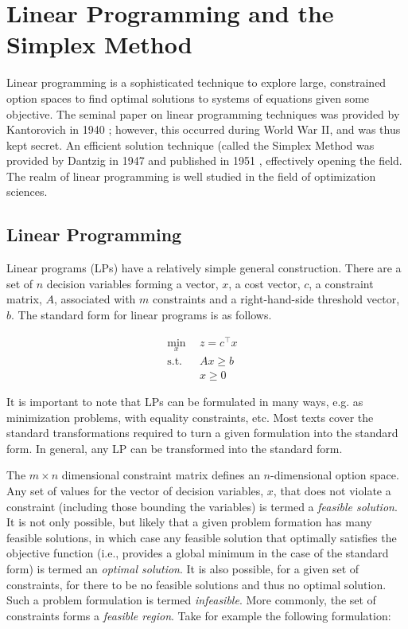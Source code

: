 \chapter{Linear Programming and the Simplex Method}\label{app:lp}

Linear programming is a sophisticated technique to explore large, constrained
option spaces to find optimal solutions to systems of equations given some
objective. The seminal paper on linear programming techniques was provided by
Kantorovich in 1940 \cite{kantorovich_new_1940}; however, this occurred during
World War II, and was thus kept secret. An efficient solution technique (called
the Simplex Method was provided by Dantzig in 1947 and published in 1951
\cite{dantzig_maximization_1951}, effectively opening the field. The realm of
linear programming is well studied in the field of optimization
sciences. 

\section{Linear Programming}

Linear programs (LPs) have a relatively simple general construction. There are a
set of $n$ decision variables forming a vector, $x$, a cost vector, $c$, a
constraint matrix, $A$, associated with $m$ constraints and a right-hand-side
threshold vector, $b$. The standard form for linear programs is as follows.

\begin{subequations}\label{eqs:std-form}
  \begin{align}
    \min_{x} \:\: & 
    z = c^{\top} x
    & \label{eqs:std-form_obj} \\
    \text{s.t.} \:\: &
    A x \geq b 
    & \label{eqs:std-form_sup} \\
    &
    x \geq 0
    &\label{eqs:std-form_x}
  \end{align}
\end{subequations}

It is important to note that LPs can be formulated in many ways, e.g. as
minimization problems, with equality constraints, etc. Most texts cover the
standard transformations required to turn a given formulation into the standard
form. In general, any LP can be transformed into the standard form.

The $m \times n$ dimensional constraint matrix defines an $n$-dimensional option
space. Any set of values for the vector of decision variables, $x$, that does
not violate a constraint (including those bounding the variables) is termed
a \textit{feasible solution}. It is not only possible, but likely that a given
problem formation has many feasible solutions, in which case any feasible
solution that optimally satisfies the objective function (i.e., provides a
global minimum in the case of the standard form) is termed an \textit{optimal
solution}. It is also possible, for a given set of constraints, for there to be
no feasible solutions and thus no optimal solution. Such a problem formulation
is termed \textit{infeasible}. More commonly, the set of constraints forms
a \textit{feasible region}. Take for example the following formulation:

